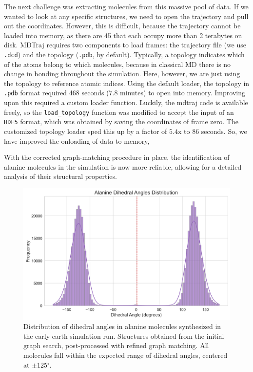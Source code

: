 The next challenge was extracting molecules from this massive pool of data.
If we wanted to look at any specific structures, we need to open the trajectory and pull out the coordinates.
However, this is difficult, because the trajectory cannot be loaded into memory, as there are 45 that each occupy more than 2 terabytes on disk.
MDTraj requires two components to load frames: the trajectory file (we use \verb|.dcd|) and the topology (\verb|.pdb|, by default).
Typically, a topology indicates which of the atoms belong to which molecules, because in classical MD there is no change in bonding throughout the simulation. 
Here, however, we are just using the topology to reference atomic indices.
Using the default loader, the topology in \verb|.pdb| format required 468 seconds (7.8 minutes) to open into memory.
Improving upon this required a custom loader function.
Luckily, the mdtraj code is available freely, so the \verb|load_topology| function was modified to accept the input of an \verb|HDF5| format, which was obtained by saving the coordinates of frame zero.
The customized topology loader sped this up by a factor of $5.4\text{x}$ to 86 seconds.
So, we have improved the onloading of data to memory, 

With the corrected graph-matching procedure in place, the identification of alanine molecules in the simulation is now more reliable, allowing for a detailed analysis of their structural properties. 

\begin{figure}[!ht]
    \centering
    \includegraphics[width=1\linewidth]{Images/alanine_dihedral/dihedral_angles_distribution.png}
    \caption[Distribution of synthesized alanine dihedral angles]{Distribution of dihedral angles in alanine molecules synthesized in the early earth simulation run. Structures obtained from the initial graph search, post-processed with refined graph matching. All molecules fall within the expected range of dihedral angles, centered at $\pm$125$^\circ$.}
    \label{fig:ala_dihedral}
\end{figure}

